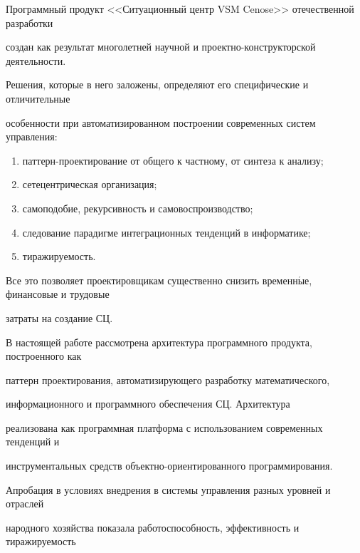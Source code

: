   Программный продукт <<Ситуационный центр VSM Cenose>> отечественной разработки 


создан как результат многолетней научной и проект\-но-кон\-ст\-рук\-тор\-ской деятельности. 


Решения, которые в него заложены, определяют его специфические и отличительные 


особенности при автоматизированном построении современных сис\-тем управ\-ле\-ния:


\begin{enumerate}[(1)] 


\item пат\-терн-про\-ек\-ти\-ро\-ва\-ние от общего к частному, от синтеза к анализу; 


\item сетецентрическая организация; 


\item самоподобие, рекурсивность и самовоспроизводство; 


\item следование  парадигме интеграционных тенденций в информатике; 


\item тиражируемость. 


\end{enumerate}


Все это  позволяет проектировщикам существенно снизить временн$\acute{\mbox{ы}}$е, финансовые и трудовые 


затраты на создание СЦ.


  


  В настоящей работе рассмотрена архитектура программного продукта, построенного как 


паттерн проектирования, автоматизирующего разработку математического, 


информационного и программного обеспечения СЦ. Архитектура 


реализована как программная платформа с использованием современных тенденций и 


инструментальных средств объект\-но-ори\-ен\-ти\-ро\-ван\-но\-го программирования.


  


  Апробация в условиях внедрения в сис\-те\-мы управ\-ле\-ния разных уровней и отраслей 


народного хозяйства показала работоспособность, эффективность и тиражируемость 


